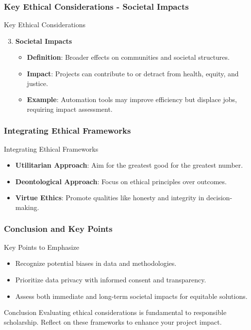 \documentclass{beamer}
\begin{document}
\begin{frame}[fragile]
    \frametitle{Key Ethical Considerations - Societal Impacts}
    \begin{block}{Key Ethical Considerations}
        \begin{enumerate}
            \setcounter{enumi}{2} %
            \item \textbf{Societal Impacts}
                \begin{itemize}
                    \item \textbf{Definition}: Broader effects on communities and societal structures.
                    \item \textbf{Impact}: Projects can contribute to or detract from health, equity, and justice.
                    \item \textbf{Example}: Automation tools may improve efficiency but displace jobs, requiring impact assessment.
                \end{itemize}
        \end{enumerate}
    \end{block}
\end{frame}

\begin{frame}[fragile]
    \frametitle{Integrating Ethical Frameworks}
    \begin{block}{Integrating Ethical Frameworks}
        \begin{itemize}
            \item \textbf{Utilitarian Approach}: Aim for the greatest good for the greatest number. 
            \item \textbf{Deontological Approach}: Focus on ethical principles over outcomes.
            \item \textbf{Virtue Ethics}: Promote qualities like honesty and integrity in decision-making.
        \end{itemize}
    \end{block}
\end{frame}

\begin{frame}[fragile]
    \frametitle{Conclusion and Key Points}
    \begin{block}{Key Points to Emphasize}
        \begin{itemize}
            \item Recognize potential biases in data and methodologies.
            \item Prioritize data privacy with informed consent and transparency.
            \item Assess both immediate and long-term societal impacts for equitable solutions.
        \end{itemize}
    \end{block}
    \begin{block}{Conclusion}
        Evaluating ethical considerations is fundamental to responsible scholarship. Reflect on these frameworks to enhance your project impact.
    \end{block}
\end{frame}
\end{document}
